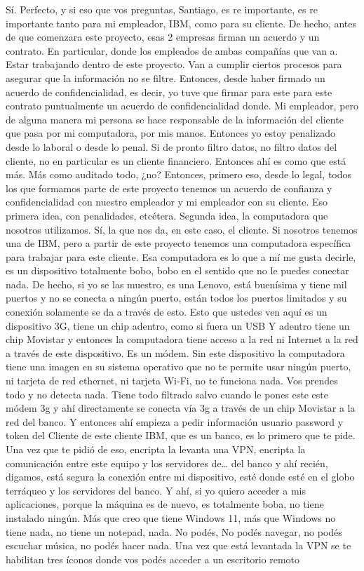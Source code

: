 \begin{description}[leftmargin=0cm, labelsep=0.5cm]
    \item[\textbf{VILLARINO PABLO RODOLFO:}] Sí. Perfecto, y si eso que vos preguntas, Santiago, es re importante, es re importante tanto para mi empleador, IBM, como para su cliente. De hecho, antes de que comenzara este proyecto, esas 2 empresas firman un acuerdo y un contrato. En particular, donde los empleados de ambas compañías que van a. Estar trabajando dentro de este proyecto. Van a cumplir ciertos procesos para asegurar que la información no se filtre. Entonces, desde haber firmado un acuerdo de confidencialidad, es decir, yo tuve que firmar para este para este contrato puntualmente un acuerdo de confidencialidad donde. Mi empleador, pero de alguna manera mi persona se hace responsable de la información del cliente que pasa por mi computadora, por mis manos. Entonces yo estoy penalizado desde lo laboral o desde lo penal. Si de pronto filtro datos, no filtro datos del cliente, no en particular es un cliente financiero. Entonces ahí es como que está más. Más como auditado todo, ¿no? Entonces, primero eso, desde lo legal, todos los que formamos parte de este proyecto tenemos un acuerdo de confianza y confidencialidad con nuestro empleador y mi empleador con su cliente. Eso primera idea, con penalidades, etcétera. Segunda idea, la computadora que nosotros utilizamos. Sí, la que nos da, en este caso, el cliente. Si nosotros tenemos una de IBM, pero a partir de este proyecto tenemos una computadora específica para trabajar para este cliente. Esa computadora es lo que a mí me gusta decirle, es un dispositivo totalmente bobo, bobo en el sentido que no le puedes conectar nada. De hecho, si yo se las muestro, es una Lenovo, está buenísima y tiene mil puertos y no se conecta a ningún puerto, están todos los puertos limitados y su conexión solamente se da a través de esto. Esto que ustedes ven aquí es un dispositivo 3G, tiene un chip adentro, como si fuera un USB Y adentro tiene un chip Movistar y entonces la computadora tiene acceso a la red ni Internet a la red a través de este dispositivo. Es un módem. Sin este dispositivo la computadora tiene una imagen en su sistema operativo que no te permite usar ningún puerto, ni tarjeta de red ethernet, ni tarjeta Wi-Fi, no te funciona nada. Vos prendes todo y no detecta nada. Tiene todo filtrado salvo cuando le pones este este módem 3g y ahí directamente se conecta vía 3g a través de un chip Movistar a la red del banco. Y entonces ahí empieza a pedir información usuario password y token del Cliente de este cliente IBM, que es un banco, es lo primero que te pide. Una vez que te pidió de eso, encripta la levanta una VPN, encripta la comunicación entre este equipo y los servidores de… del banco y ahí recién, digamos, está segura la conexión entre mi dispositivo, esté donde esté en el globo terráqueo y los servidores del banco. Y ahí, si yo quiero acceder a mis aplicaciones, porque la máquina es de nuevo, es totalmente boba, no tiene instalado ningún. Más que creo que tiene Windows 11, más que Windows no tiene nada, no tiene un notepad, nada. No podés, No podés navegar, no podés escuchar música, no podés hacer nada. Una vez que está levantada la VPN se te habilitan tres íconos donde vos podés acceder a un escritorio remoto 
\end{description}
